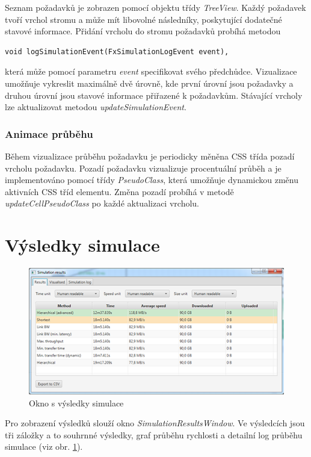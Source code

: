 \documentclass[czech,DP]{thesiskiv}
\begin{document}
Seznam požadavků je zobrazen pomocí objektu třídy \textit{TreeView}. Každý požadavek tvoří vrchol stromu a může mít libovolné následníky, poskytující dodatečné stavové informace. Přidání vrcholu do stromu požadavků probíhá metodou 

\begin{verbatim}
void logSimulationEvent(FxSimulationLogEvent event),
\end{verbatim}
\noindent která může pomocí parametru \textit{event} specifikovat svého předchůdce. Vizualizace umožňuje vykreslit maximálně dvě úrovně, kde první úrovní jsou požadavky a druhou úrovní jsou stavové informace přiřazené k požadavkům. Stávající vrcholy lze aktualizovat metodou \textit{updateSimulationEvent}.

\subsubsection*{Animace průběhu}

Během vizualizace průběhu požadavku je periodicky měněna CSS třída pozadí vrcholu požadavku. Pozadí požadavku vizualizuje procentuální průběh a je implementováno pomocí třídy \textit{PseudoClass}, která umožňuje dynamickou změnu aktivních CSS tříd elementu. Změna pozadí probíhá v metodě \textit{updateCellPseudoClass} po každé aktualizaci vrcholu.

\section{Výsledky simulace}

\begin{figure}[H]
\centering
	\includegraphics{img/vysledky_simulace.png}
\caption{Okno s výsledky simulace}
\label{fig:vysledky_simulace}
\end{figure}

Pro zobrazení výsledků slouží okno \textit{SimulationResultsWindow}. Ve výsledcích jsou tři záložky a to souhrnné výsledky, graf průběhu rychlosti a detailní log průběhu simulace (viz obr. \ref{fig:vysledky_simulace}). 
\end{document}
